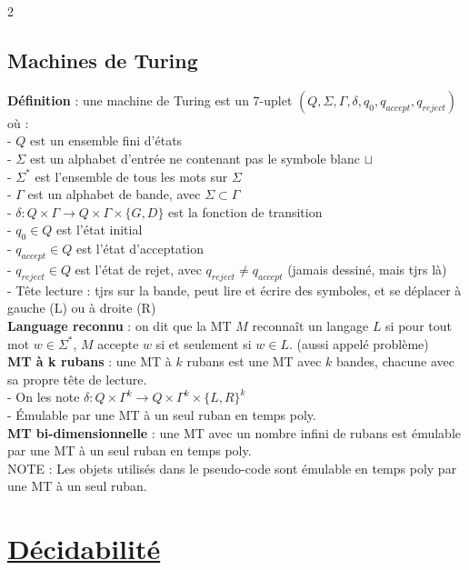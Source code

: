 \documentclass[11pt]{article}
\begin{document}
\begin{multicols}{2}
  \subsection{Machines de Turing}
  \textbf{Définition} : une machine de Turing est un 7-uplet $(Q, \Sigma, \Gamma, \delta, q_0, q_{accept}, q_{reject})$ où :\\
  - $Q$ est un ensemble fini d'états\\
  - $\Sigma$ est un alphabet d'entrée ne contenant pas le symbole blanc $\sqcup$\\
  - $\Sigma^{*}$ est l'ensemble de tous les mots sur $\Sigma$\\
  - $\Gamma$ est un alphabet de bande, avec $\Sigma \subset \Gamma$\\
  - $\delta : Q \times \Gamma \rightarrow Q \times \Gamma \times \{G, D\}$ est la fonction de transition\\
  - $q_0 \in Q$ est l'état initial\\
  - $q_{accept} \in Q$ est l'état d'acceptation\\
  - $q_{reject} \in Q$ est l'état de rejet, avec $q_{reject} \neq q_{accept}$ (jamais dessiné, mais tjrs là)\\
  - Tête lecture : tjrs sur la bande, peut lire et écrire des symboles, et se déplacer à gauche (L) ou à droite (R)\\
  \textbf{Language reconnu} : on dit que la MT $M$ reconnaît un langage $L$ si pour tout mot $w \in \Sigma^*$, $M$ accepte $w$ si et seulement si $w \in L$. (aussi appelé problème)\\
  \textbf{MT à k rubans} : une MT à $k$ rubans est une MT avec $k$ bandes, chacune avec sa propre tête de lecture.\\
  - On les note $\delta:Q \times \Gamma^k \rightarrow Q \times \Gamma^k \times \{L, R\}^k$\\
  - Émulable par une MT à un seul ruban en temps poly.\\
  \textbf{MT bi-dimensionnelle} : une MT avec un nombre infini de rubans est émulable par une MT à un seul ruban en temps poly.\\
  NOTE : Les objets utilisés dans le pseudo-code sont émulable en temps poly par une MT à un seul ruban.\\

  \section{\underline{Décidabilité}}

\end{multicols}
\end{document}
